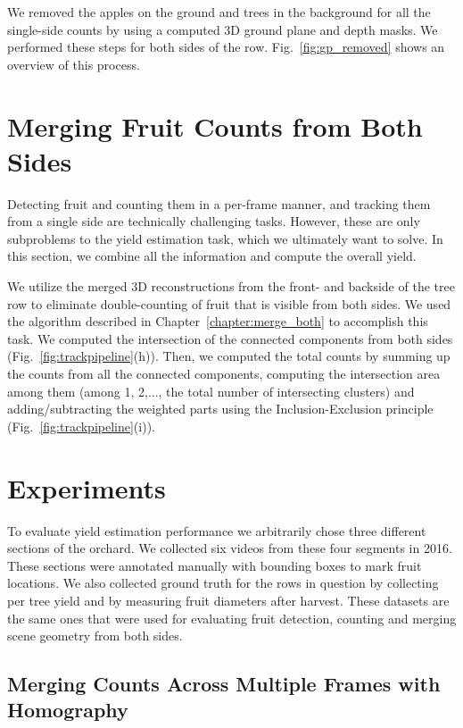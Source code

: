 We removed the apples on the ground and trees in the background for all the single-side counts by using a computed 3D ground plane and depth masks. We performed these steps for both sides of the row. Fig.~\ref{fig:gp_removed} shows an overview of this process. 



\section{Merging Fruit Counts from Both Sides}\label{sec:track_both}
Detecting fruit and counting them in a per-frame manner, and tracking them from a single side are technically challenging tasks. However, these are only subproblems to the yield estimation task, which we ultimately want to solve. In this section, we combine all the information and compute the overall yield. 

We utilize the merged 3D reconstructions from the front- and backside of the tree row to eliminate double-counting of fruit that is visible from both sides. We used the algorithm described in Chapter~\ref{chapter:merge_both} to accomplish this task. We computed the intersection of the connected components from both sides (Fig.~\ref{fig:trackpipeline}(h)). Then, we computed the total counts by summing up the counts from all the connected components, computing the intersection area among them (among 1, 2,..., the total number of intersecting clusters) and adding/subtracting the weighted parts using the Inclusion-Exclusion principle~\cite{andreescu_inclusion-exclusion_2004} (Fig.~\ref{fig:trackpipeline}(i)). 





\section{Experiments}\label{sec:track_exp}
To evaluate yield estimation performance we arbitrarily chose three different sections of the orchard. We collected six videos from these four segments in 2016. These sections were annotated manually with bounding boxes to mark fruit locations. We also collected ground truth for the rows in question by collecting per tree yield and by measuring fruit diameters after harvest. These datasets are the same ones that were used for evaluating fruit detection, counting and merging scene geometry from both sides.

\subsection{Merging Counts Across Multiple Frames with Homography}

